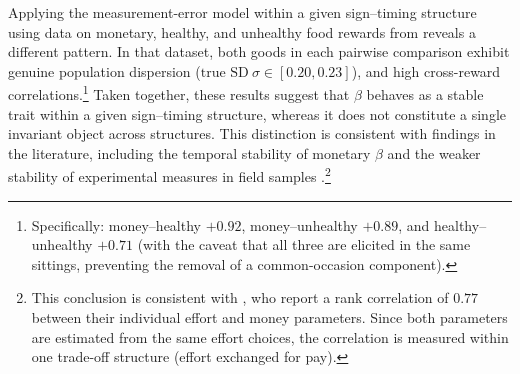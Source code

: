 \documentclass[11pt,a4paper]{article}
\theoremstyle{plain}
\theoremstyle{definition}
\begin{document}
Applying the measurement-error model within a given sign--timing structure using data on monetary, healthy, and unhealthy food rewards from \citet{cheung2022} reveals a different pattern. In that dataset, both goods in each pairwise comparison exhibit genuine population dispersion ($\text{true SD}\ \sigma \in [0.20, 0.23]$), and high cross-reward correlations.\footnote{%
Specifically: money--healthy $+0.92$, %
money--unhealthy $+0.89$, and healthy--unhealthy $+0.71$ %
(with the caveat that all three are elicited in the same sittings, preventing the removal of a common-occasion component).}
Taken together, these results suggest that $\beta$ behaves as a stable trait within a given sign--timing structure, whereas it does not constitute a single invariant object across structures. This distinction is consistent with findings in the literature, 
including the temporal stability of monetary $\beta$ \citep{meiersprenger2015} and the weaker stability of experimental measures in field samples \citep{chuang2015}.\footnote{%
This conclusion is consistent with \citet{cerrone2026}, who report a rank correlation of $0.77$ between their individual effort and money parameters. Since both parameters are estimated from the same effort choices, the correlation is measured within one trade-off structure (effort exchanged for pay).} 




\end{document}

